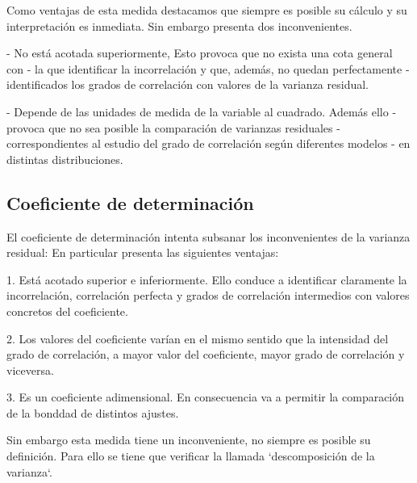 \documentclass{article}
\theoremstyle{definition}
\begin{document}
Como ventajas de esta medida destacamos que siempre es posible su cálculo y su
interpretación es inmediata. Sin embargo presenta dos inconvenientes.

\vspace{2mm}

- No está acotada superiormente, Esto provoca que no exista una cota general con
- la que identificar la incorrelación y que, además, no quedan perfectamente
- identificados los grados de correlación con valores de la varianza residual.

\vspace{2mm}

- Depende de las unidades de medida de la variable al cuadrado. Además ello
- provoca que no sea posible la comparación de varianzas residuales
- correspondientes al estudio del grado de correlación según diferentes modelos
- en distintas distribuciones.

\subsection{Coeficiente de determinación}

	El coeficiente de determinación intenta subsanar los inconvenientes de la
	varianza residual: En particular presenta las siguientes ventajas:
	\vspace{2mm}

	1. Está acotado superior e inferiormente. Ello conduce a identificar
	claramente la incorrelación, correlación perfecta y grados de correlación
	intermedios con valores concretos del coeficiente.

	\vspace{2mm}

	2. Los valores del coeficiente varían en el mismo sentido que la intensidad del
	grado de correlación, a mayor valor del coeficiente, mayor grado de
	correlación y viceversa.

	\vspace{2mm}

	3. Es un coeficiente adimensional. En consecuencia va a permitir la
	comparación de la bonddad de distintos ajustes.

	\vspace{2mm}

	Sin embargo esta medida tiene un inconveniente, no siempre es posible su
	definición. Para ello se tiene que verificar la llamada `descomposición de la
	varianza`.

	\vspace{2mm}
\end{document}
